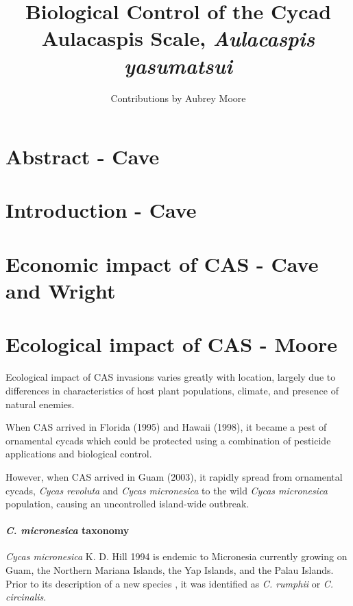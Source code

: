 \documentclass[12pt,letterpaper,english,bibliography=totocnumbered, abstract=on]{scrartcl}
\begin{document}
\title{Biological Control of the Cycad Aulacaspis Scale, \textit{Aulacaspis yasumatsui}}

\author{Contributions by Aubrey Moore}

\maketitle
\newpage
\tableofcontents

\pagebreak

\section{Abstract - Cave}

\section{Introduction - Cave}

\section{Economic impact of CAS - Cave and Wright}
\section{Ecological impact of CAS - Moore}

Ecological impact of CAS invasions varies greatly with location, largely due to differences in characteristics of host plant populations, climate, and presence of natural enemies.

When CAS arrived in Florida (1995) and Hawaii (1998), it became a pest of ornamental cycads which could be protected using a combination of pesticide applications and biological control. 

However, when CAS arrived in Guam (2003), it rapidly spread from ornamental cycads, \textit{Cycas revoluta} and \textit{Cycas micronesica} to the wild \textit{Cycas micronesica} population, causing an uncontrolled island-wide outbreak. 

\paragraph{\textit{C. micronesica} taxonomy} \textit{Cycas micronesica} K. D. Hill 1994 is endemic to Micronesia currently growing on Guam, the Northern Mariana Islands, the Yap Islands, and the Palau Islands. Prior to its description of a new species \parencite{hillCycasRumphiiComplex1994}, it was identified as \textit{C. rumphii} or \textit{C. circinalis}.
\end{document}
